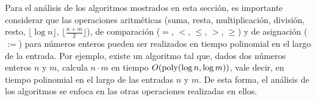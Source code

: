 Para el análisis de los algoritmos mostrados en esta sección, es importante considerar que las operaciones aritméticas (suma, resta, multiplicación, división, resto, $\lfloor \log n \rfloor$, $\lfloor \frac{n+m}{2} \rfloor$), de comparación ($=$, $<$, $\leq$, $>$, $\geq$) y de asignación ($:=$) para números enteros pueden ser realizados en tiempo polinomial en el largo de la entrada. Por ejemplo, existe un algoritmo tal que, dados dos números enteros $n$ y $m$, calcula $n\cdot m$ en tiempo $O({\rm poly}(\log n, \log m))$, vale decir, en tiempo polinomial en el largo de las entradas $n$ y $m$. De esta forma, el análisis de los algoritmos se enfoca en las otras operaciones realizadas en ellos.


